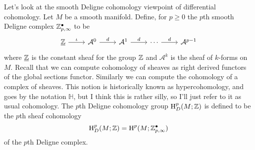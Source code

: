 \documentclass{amsart}
\begin{document}
Let's look at the smooth Deligne cohomology viewpoint of differential cohomology.
Let $M$ be a smooth manifold.
Define, for $p\geq0$ the $p$th smooth Deligne complex $\mathbb{Z}_{p,\infty}^\bullet$ to be
\begin{equation*}
    \begin{tikzcd}
        \underline{\Z} \rar{\iota} & \mathcal{A}^0 \rar{d} & \mathcal{A}^1 \rar{d} & \cdots \rar{d}& \mathcal{A}^{p-1}
    \end{tikzcd}
\end{equation*}
where $\underline{\mathbb{Z}}$ is the constant sheaf for the group $\mathbb{Z}$ and  
$\mathcal{A}^k$ is the sheaf of $k$-forms on $M$. Recall that we can compute
cohomology of sheaves as right derived functors of the global sections functor. Similarly we
can compute the cohomology of a complex of sheaves. This notion is historically known as
hypercohomology, and goes by the notation $\mathbb{H}$, but I think this is rather silly, so I'll
just refer to it as usual cohomology. The $p$th Deligne cohomology group $\operatorname{H}_D^p(M;\mathbb{Z})$ is
defined to be the $p$th sheaf cohomology
\begin{equation*}
    \operatorname{H}_D^p(M;\mathbb{Z}) = \operatorname{H}^p(M; \mathbb{Z}_{p,\infty}^\bullet)
\end{equation*}
of the $p$th Deligne complex.
\end{document}
